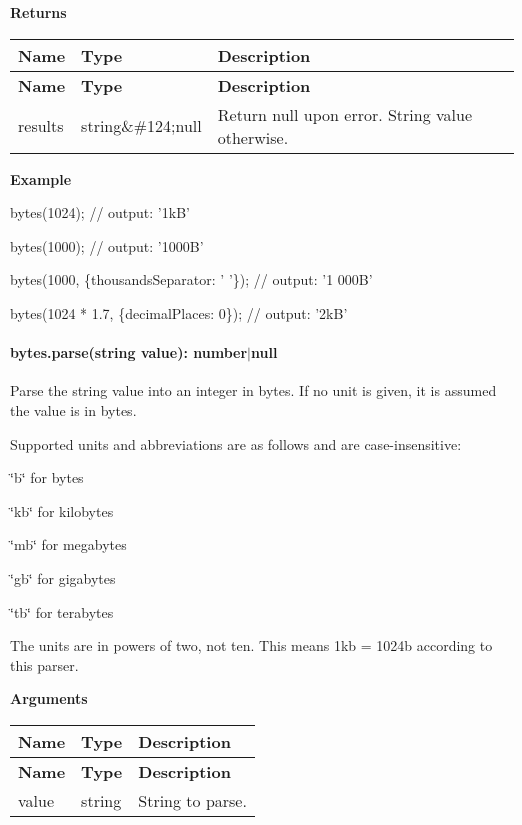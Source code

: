 {\bfseries Returns}

\tabulinesep=1mm
\begin{longtabu} spread 0pt [c]{*{3}{|X[-1]}|}
\hline
\rowcolor{\tableheadbgcolor}\textbf{ Name  }&\textbf{ Type  }&\textbf{ Description   }\\
\endfirsthead
\hline
\endfoot
\hline
\rowcolor{\tableheadbgcolor}\textbf{ Name  }&\textbf{ Type  }&\textbf{ Description   }\\
\endhead
results  &{\ttfamily string}\&\#124;{\ttfamily null}  &Return null upon error. String value otherwise.   \\
\end{longtabu}


{\bfseries Example}


\begin{DoxyCode}
bytes(1024);
// output: '1kB'

bytes(1000);
// output: '1000B'

bytes(1000, \{thousandsSeparator: ' '\});
// output: '1 000B'

bytes(1024 * 1.7, \{decimalPlaces: 0\});
// output: '2kB'
\end{DoxyCode}


\paragraph*{bytes.\+parse(string value)\+: number$\vert$null}

Parse the string value into an integer in bytes. If no unit is given, it is assumed the value is in bytes.

Supported units and abbreviations are as follows and are case-\/insensitive\+:


\begin{DoxyItemize}
\item \char`\"{}b\char`\"{} for bytes
\item \char`\"{}kb\char`\"{} for kilobytes
\item \char`\"{}mb\char`\"{} for megabytes
\item \char`\"{}gb\char`\"{} for gigabytes
\item \char`\"{}tb\char`\"{} for terabytes
\end{DoxyItemize}

The units are in powers of two, not ten. This means 1kb = 1024b according to this parser.

{\bfseries Arguments}

\tabulinesep=1mm
\begin{longtabu} spread 0pt [c]{*{3}{|X[-1]}|}
\hline
\rowcolor{\tableheadbgcolor}\textbf{ Name  }&\textbf{ Type  }&\textbf{ Description   }\\
\endfirsthead
\hline
\endfoot
\hline
\rowcolor{\tableheadbgcolor}\textbf{ Name  }&\textbf{ Type  }&\textbf{ Description   }\\
\endhead
value  &{\ttfamily string}  &String to parse.   \\
\end{longtabu}


